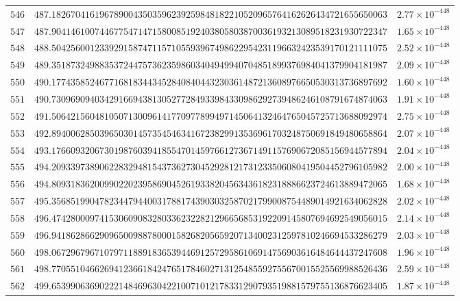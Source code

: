 \documentclass[12pt,reqno]{amsart}
\theoremstyle{remark}
\begin{document}
\begin{longtable}{clc}
$546$ & $487.1826704161967890043503596239259848182210520965764162626434721655650063$ & $2.77\times 10^{-448}$ \\
$547$ & $487.9041461007446775471471580085192403805803870036193213089518231930722347$ & $1.65\times 10^{-448}$ \\
$548$ & $488.5042560012339291587471157105593967498622954231196632423539170121111075$ & $2.52\times 10^{-448}$ \\
$549$ & $489.3518732498835372447573623598603404949940704851899376984041379904181987$ & $2.09\times 10^{-448}$ \\
$550$ & $490.1774358524677168183443452840840443230361487213608976650530313736897692$ & $1.60\times 10^{-448}$ \\
$551$ & $490.7309690940342916694381305277284933984330986292739486246108791674874063$ & $1.91\times 10^{-448}$ \\
$552$ & $491.5064215604810507130096141770977899497145064132464765045725713688092974$ & $2.75\times 10^{-448}$ \\
$553$ & $492.8940062850396503014573545463416723829913536961703248750691849480658864$ & $2.07\times 10^{-448}$ \\
$554$ & $493.1766093206730198760394185547014597661273671491157690672085156944577894$ & $2.04\times 10^{-448}$ \\
$555$ & $494.2093397389062283294815437362730452928121731233506080419504452796105982$ & $2.00\times 10^{-448}$ \\
$556$ & $494.8093183620099022023958690452619338204563436182318886623724613889472065$ & $1.68\times 10^{-448}$ \\
$557$ & $495.3568519904782344794400317881743903032587021799008754489014921634062828$ & $2.02\times 10^{-448}$ \\
$558$ & $496.4742800097415306090832803362322821296656853192209145807694692549056015$ & $2.14\times 10^{-448}$ \\
$559$ & $496.9418628662909650098878000158268205659207134002312597810246694533286279$ & $2.03\times 10^{-448}$ \\
$560$ & $498.0672967967107971188918365394469125729586106914756903616484644437247608$ & $1.96\times 10^{-448}$ \\
$561$ & $498.7705510466269412366184247651784602713125485592755670015525569988526436$ & $2.59\times 10^{-448}$ \\
$562$ & $499.6539906369022214846963042210071012178331290793519881579755136876623405$ & $1.87\times 10^{-448}$ \\

\end{longtable}
\end{document}
